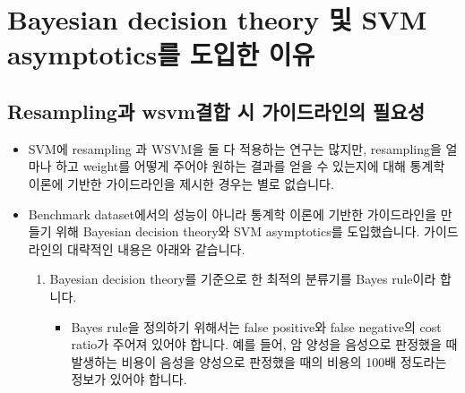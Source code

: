 \documentclass[a4papaer, 11pt]{article}
\begin{document}
\section{Bayesian decision theory 및 SVM asymptotics를 도입한 이유}
\subsection{Resampling과 wsvm결합 시 가이드라인의 필요성}
\begin{itemize}
	\item SVM에 resampling 과 WSVM을 둘 다 적용하는 연구는 많지만, resampling을 얼마나 하고 weight를 어떻게 주어야 원하는 결과를 얻을 수 있는지에 대해 통계학 이론에 기반한 가이드라인을 제시한 경우는 별로 없습니다.
	\item Benchmark dataset에서의 성능이 아니라 통계학 이론에 기반한 가이드라인을 만들기 위해 Bayesian decision theory와 SVM asymptotics를 도입했습니다. 가이드라인의 대략적인 내용은 아래와 같습니다.
	\begin{enumerate}
		\item Bayesian decision theory를 기준으로 한 최적의 분류기를 Bayes rule이라 합니다.
		\begin{itemize}
			\item Bayes rule을 정의하기 위해서는 false positive와 false negative의 cost ratio가 주어져 있어야 합니다. 예를 들어, 암 양성을 음성으로 판정했을 때 발생하는 비용이 음성을 양성으로 판정했을 때의 비용의 100배 정도라는 정보가 있어야 합니다.
		\end{itemize}


\end{enumerate}
\end{itemize}
\end{document}
